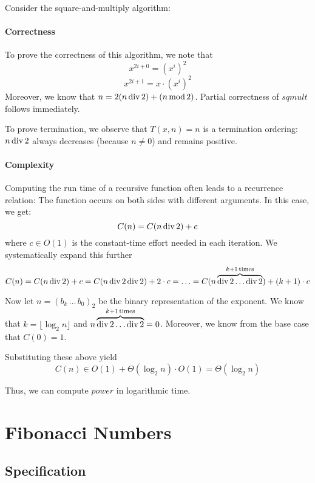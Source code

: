 Consider the square-and-multiply algorithm:
\begin{acode}
\end{acode}

\paragraph{Correctness}
To prove the correctness of this algorithm, we note that
\[x^{2i+0}=(x^i)^2\]
\[x^{2i+1}=x\cdot(x^i)^2\]
Moreover, we know that $n=2(n\mathop{\mathrm{div}} 2)+(n\mathop{\mathrm{mod}} 2)$.
Partial correctness of $sqmult$ follows immediately.

To prove termination, we observe that $T(x,n)=n$ is a termination ordering: $n\mathop{\mathrm{div}} 2$ always decreases (because $n\neq 0$) and remains positive.

\paragraph{Complexity}
Computing the run time of a recursive function often leads to a recurrence relation: The function occurs on both sides with different arguments.
In this case, we get:
 \[C(n)=C(n\mathop{\mathrm{div}} 2) + c\]
where $c\in O(1)$ is the constant-time effort needed in each iteration.
We systematically expand this further
 \[C(n)=C(n\mathop{\mathrm{div}} 2) + c = C(n\mathop{\mathrm{div}} 2\mathop{\mathrm{div}} 2) + 2\cdot c=\ldots=C(n\overbrace{\mathop{\mathrm{div}} 2\ldots\mathop{\mathrm{div}} 2}^{k+1\,\text{times}})+(k+1)\cdot c\]

Now let $n=(b_k\,\ldots\,b_0)_2$ be the binary representation of the exponent.
We know that $k=\lfloor\log_2 n\rfloor$ and $n\overbrace{\mathop{\mathrm{div}} 2\ldots\mathop{\mathrm{div}} 2}^{k+1\,\text{times}}=0$.
Moreover, we know from the base case that $C(0)=1$.

Substituting these above yield
\[C(n)\in O(1)+\Theta(\log_2 n)\cdot O(1)=\Theta(\log_2 n)\]

Thus, we can compute $power$ in logarithmic time.

\section{Fibonacci Numbers}\label{sec:ad:fib}

\subsection{Specification}\label{sec:ad:fib:spec}

